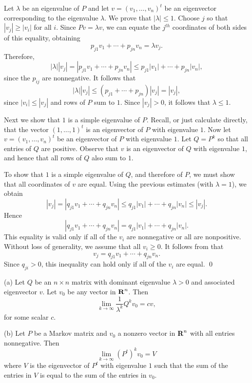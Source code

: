 Let $\lambda$ be an eigenvalue of $P$ and let $v=(v_1,\ldots,v_n)^t$ be an 
eigenvector corresponding to the eigenvalue $\lambda$.  We prove that 
$|\lambda|\leq 1$.  Choose $j$ so that $|v_j|\ge|v_i|$ for all $i$.  Since 
$Pv=\lambda v$, we can equate the $j^{th}$ coordinates of both sides of 
this equality, obtaining
\[
p_{j1}v_1 + \cdots + p_{jn}v_n = \lambda v_j.
\]
Therefore,
\[
 |\lambda| |v_j| = |p_{j1}v_1 + \cdots + p_{jn}v_n| \leq 
p_{j1}|v_1| + \cdots + p_{jn}|v_n|,
\]
since the $p_{ij}$ are nonnegative.  It follows that 
\[
|\lambda| |v_j| \leq (p_{j1}+\cdots+p_{jn})|v_j| =|v_j|,
\]
since $|v_i|\le|v_j|$ and rows of $P$ sum to $1$.  Since $|v_j|>0$, it 
follows that $\lambda\leq 1$.

Next we show that $1$ is a simple eigenvalue of $P$.  Recall, or just 
calculate directly, that the vector $(1,\ldots,1)^t$ is an eigenvector of $P$ 
with eigenvalue $1$.  Now let $v=(v_1,\ldots,v_n)^t$ be an eigenvector of $P$ 
with eigenvalue $1$.  Let $Q=P^k$ so that all entries of $Q$ are positive. 
Observe that $v$ is an eigenvector of $Q$ with eigenvalue $1$, and hence that 
all rows of $Q$ also sum to $1$.

To show that $1$ is a simple eigenvalue of $Q$, and therefore of $P$, we must 
show that all coordinates of $v$ are equal.  Using the previous estimates 
(with $\lambda=1$), we obtain 
\begin{equation}  \label{E:ineqM}
|v_j|= |q_{j1}v_1 + \cdots + q_{jn}v_n| \leq  q_{j1}|v_1| + \cdots + 
q_{jn}|v_n| \leq |v_j|.
\end{equation}
Hence 
\[
|q_{j1}v_1 + \cdots + q_{jn}v_n| =  q_{j1}|v_1| + \cdots + q_{jn}|v_n|.
\]
This equality is valid only if all of the $v_i$ are nonnegative or all are 
nonpositive.  Without loss of generality, we assume that all $v_i\geq 0$.
It follows from  that 
\[
v_j= q_{j1}v_1 + \cdots + q_{jn}v_n.
\]
Since $q_{ji}>0$, this inequality can hold only if all of the $v_i$ are
equal.  \qed


\begin{thm} \label{T:convergetoeig}
(a)  Let $Q$ be an $n\times n$ matrix with dominant eigenvalue 
$\lambda>0$ and associated eigenvector $v$.  Let $v_0$ be any vector in 
$\mbox{$\bf{R}$}^n$.  Then
\[
\lim_{k\to\infty}\frac{1}{\lambda^k}Q^kv_0 = cv,
\]
for some scalar $c$.

(b)  Let $P$ be a Markov matrix and $v_0$ a nonzero vector in $\mbox{$\bf{R}$}^n$
with all entries nonnegative.  Then 
\[
\lim_{k\to\infty}(P^t)^kv_0 = V
\]
where $V$ is the eigenvector of $P^t$ with eigenvalue $1$ such that the 
sum of the entries in $V$ is equal to the sum of the entries in $v_0$.
\end{thm} 

